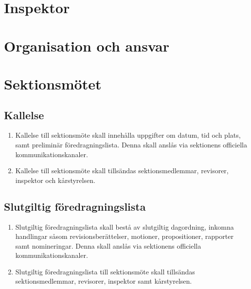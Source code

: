 \documentclass[11pt,a4paper]{article}
\begin{document}
\newpage

\section{Inspektor}

\section{Organisation och ansvar}


\newpage

\section{Sektionsmötet}


\subsection{Kallelse}

\begin{enumerate}[\thesubsection .1]

\item Kallelse till sektionsmöte  skall innehålla uppgifter om datum, tid och plats, samt preliminär föredragningslista. Denna skall anslås via sektionens officiella kommunikationskanaler.

\item Kallelse till sektionsmöte skall tillsändas sektionsmedlemmar, revisorer, inspektor och kårstyrelsen.

\end{enumerate}

\subsection{Slutgiltig föredragningslista}
\begin{enumerate}[\thesubsection .1]

\item Slutgiltig föredragningslista skall bestå av slutgiltig dagordning, inkomna handlingar såsom revisionsberättelser, motioner, propositioner, rapporter samt nomineringar. Denna skall anslås via sektionens officiella kommunikationskanaler.

\item Slutgiltig föredragningslista till sektionsmöte skall tillsändas sektionsmedlemmar, revisorer, inspektor samt kårstyrelsen.

\end{enumerate}
\end{document}
